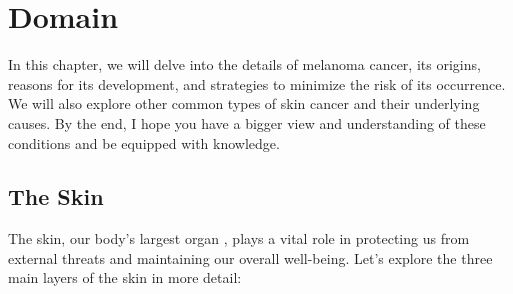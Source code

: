 \chapter{Domain}
\label{cap:problem_domain}

In this chapter, we will delve into the details of melanoma cancer, its origins, reasons for its development, and strategies to minimize the risk of its occurrence. We will also explore other common types of skin cancer and their underlying causes. By the end, I hope you have a bigger view and understanding of these conditions and be equipped with knowledge. \\

\section{The Skin}

The skin, our body's largest organ \cite{BaseCancerKnowledge}, plays a vital role in protecting us from external threats and maintaining our overall well-being. Let's explore the three main layers of the skin in more detail:

